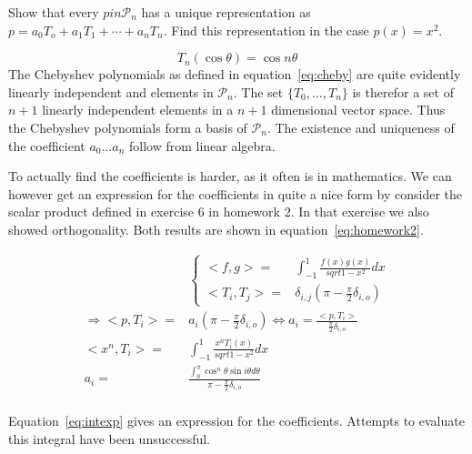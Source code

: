 \begin{problem}
  Show that every $p in \mathcal{P}_n$ has a unique representation as
  $p = a_0 T_o + a_1 T_1 + \cdots + a_n T_n$. Find this representation
  in the case $p(x) = x^2$.
\end{problem}

\begin{solution}
  \begin{equation}
    \label{eq:cheby} T_n(\cos{\theta}) = \cos{n\theta}
  \end{equation} The Chebyshev polynomials as defined in
  equation~\ref{eq:cheby} are quite evidently linearly independent and
  elements in $\mathcal{P}_n$. The set $\{ T_0, \dots , T_n\}$ is
  therefor a set of $n+1$ linearly independent elements in a $n+1$
  dimensional vector space. Thus the Chebyshev polynomials form a basis
  of $\mathcal{P}_n$. The existence and uniqueness of the
  coefficient $a_0 \dots a_n$ follow from linear algebra.
  
  To actually find the coefficients is harder, as it often is in
  mathematics. We can however get an expression for the coefficients in
  quite a nice form by consider the scalar product defined in exercise 6
  in homework 2. In that exercise we also showed orthogonality. Both
  results are shown in equation~\ref{eq:homework2}.

  \begin{align}
    \label{eq:homework2}
    & \begin{cases}
      <f, g> = & \int_{-1}^{1} \frac{f(x) g(x)}{sqrt{1 - x^2}} dx \\
      <T_i, T_j> = & \delta_{i,j} ( \pi - \frac{\pi}{2}\delta_{i,o} )
    \end{cases} \\
    \nonumber
    \Rightarrow <p, T_i> =  & a_i ( \pi - \frac{\pi}{2}\delta_{i,o} ) 
                              \Leftrightarrow a_i =
                              \frac{<p,T_i>}{\frac{\pi}{2}\delta_{i,o}} \\
    \nonumber 
    <x^n, T_i>  = & \int_{-1}^{1} \frac{x^n T_i(x)}{sqrt{1 - x^2}} dx
    \\
    \label{eq:intexp} 
    a_i = & \frac{\int_0^\pi \cos^{n}\theta \sin{i\theta} d\theta}{\pi
            - \frac{\pi}{2}\delta_{i,o}} \\
  \end{align}

Equation~\ref{eq:intexp} gives an expression for the
coefficients. Attempts to evaluate this integral have been
unsuccessful.

\end{solution}

